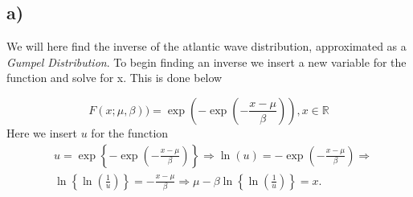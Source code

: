 
\subsection*{a)}
We will here find the inverse of the atlantic wave distribution, approximated as a \textit{Gumpel Distribution}. To begin finding an inverse we insert a new variable for the function and solve for x. This is done below

\[ F(x;\mu,\beta))=\exp\left(-\exp\left(-\frac{x-\mu}{\beta}\right)\right), x \in \mathbb{R} \]
Here we insert $u$ for the function
\begin{align*}
&u = \exp \left \{ -\exp\left(-\frac{x-\mu}{\beta}\right)\right\} \Rightarrow \ln(u)=-\exp\left(-\frac{x-\mu}{\beta}\right) \Rightarrow \\
& \ln\left\{\ln\left(\frac{1}{u}\right)\right\}=-\frac{x-\mu}{\beta} \Rightarrow \mu-\beta \ln \left \{\ln\left ( \frac{1}{u}\right ) \right \}=x.
\end{align*}
